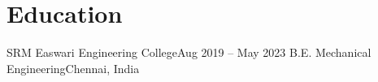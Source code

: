 \section{Education}
\resumeSubHeadingListStart

\resumeSubheading
{SRM Easwari Engineering College}{Aug 2019 -- May 2023}
{B.E. Mechanical Engineering}{Chennai, India}

\resumeSubHeadingListEnd
